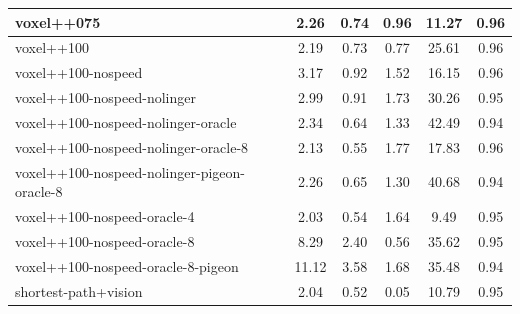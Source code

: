 \begin{table}
\begin{longtable}{|l|c|c|c|c|c|}
voxel++075 & {\cellcolor[HTML]{D9EAE6}} \color[HTML]{000000} 2.26 & {\cellcolor[HTML]{EBF2F0}} \color[HTML]{000000} 0.74 & {\cellcolor[HTML]{EBF2F0}} \color[HTML]{000000} 0.96 & 11.27 & 0.96 \\ \hline
voxel++100 & {\cellcolor[HTML]{DAEAE6}} \color[HTML]{000000} 2.19 & {\cellcolor[HTML]{EBF2F0}} \color[HTML]{000000} 0.73 & {\cellcolor[HTML]{EBF2F0}} \color[HTML]{000000} 0.77 & 25.61 & 0.96 \\ \hline
voxel++100-nospeed & {\cellcolor[HTML]{CBE3DE}} \color[HTML]{000000} 3.17 & {\cellcolor[HTML]{EBF2F0}} \color[HTML]{000000} 0.92 & {\cellcolor[HTML]{A7D1C9}} \color[HTML]{000000} 1.52 & 16.15 & 0.96 \\ \hline
voxel++100-nospeed-nolinger & {\cellcolor[HTML]{CEE4E0}} \color[HTML]{000000} 2.99 & {\cellcolor[HTML]{EBF2F0}} \color[HTML]{000000} 0.91 & {\cellcolor[HTML]{89C3B7}} \color[HTML]{000000} 1.73 & 30.26 & 0.95 \\ \hline
voxel++100-nospeed-nolinger-oracle & {\cellcolor[HTML]{D8E9E5}} \color[HTML]{000000} 2.34 & {\cellcolor[HTML]{EBF2F0}} \color[HTML]{000000} 0.64 & {\cellcolor[HTML]{C2DED8}} \color[HTML]{000000} 1.33 & 42.49 & 0.94 \\ \hline
voxel++100-nospeed-nolinger-oracle-8 & {\cellcolor[HTML]{DBEBE7}} \color[HTML]{000000} 2.13 & {\cellcolor[HTML]{EBF2F0}} \color[HTML]{000000} 0.55 & {\cellcolor[HTML]{83C0B4}} \color[HTML]{000000} 1.77 & 17.83 & 0.96 \\ \hline
voxel++100-nospeed-nolinger-pigeon-oracle-8 & {\cellcolor[HTML]{D9EAE6}} \color[HTML]{000000} 2.26 & {\cellcolor[HTML]{EBF2F0}} \color[HTML]{000000} 0.65 & {\cellcolor[HTML]{C7E1DB}} \color[HTML]{000000} 1.30 & 40.68 & 0.94 \\ \hline
voxel++100-nospeed-oracle-4 & {\cellcolor[HTML]{DCEBE8}} \color[HTML]{000000} 2.03 & {\cellcolor[HTML]{EBF2F0}} \color[HTML]{000000} 0.54 & {\cellcolor[HTML]{96C9BF}} \color[HTML]{000000} 1.64 & 9.49 & 0.95 \\ \hline
voxel++100-nospeed-oracle-8 & {\cellcolor[HTML]{7FBEB1}} \color[HTML]{000000} 8.29 & {\cellcolor[HTML]{9ACBC1}} \color[HTML]{000000} 2.40 & {\cellcolor[HTML]{EBF2F0}} \color[HTML]{000000} 0.56 & 35.62 & 0.95 \\ \hline
voxel++100-nospeed-oracle-8-pigeon & {\cellcolor[HTML]{55AA99}} \color[HTML]{F1F1F1} 11.12 & {\cellcolor[HTML]{55AA99}} \color[HTML]{F1F1F1} 3.58 & {\cellcolor[HTML]{90C7BC}} \color[HTML]{000000} 1.68 & 35.48 & 0.94 \\ \hline
shortest-path+vision & {\cellcolor[HTML]{DCEBE8}} \color[HTML]{000000} 2.04 & {\cellcolor[HTML]{EBF2F0}} \color[HTML]{000000} 0.52 & {\cellcolor[HTML]{EBF2F0}} \color[HTML]{000000} 0.05 & 10.79 & 0.95 \\ \hline

\end{longtable}
\end{table}
